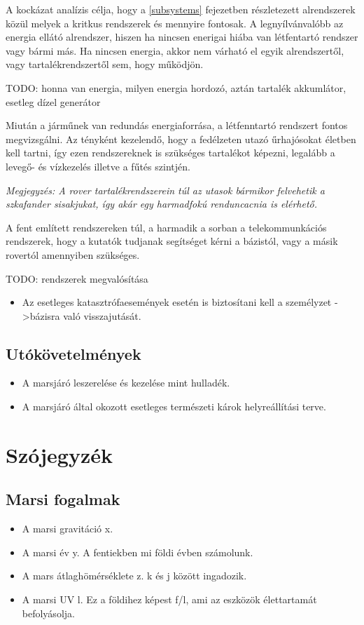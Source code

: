 \documentclass[12pt]{report}
\begin{document}
\begin{itemize}
A kockázat analízis célja, hogy a \ref{subsystems} fejezetben részletezett alrendszerek közül melyek a kritkus rendszerek és mennyire fontosak. A legnyílvánvalóbb az energia ellátó alrendszer, hiszen ha nincsen enerigai hiába van létfentartó rendszer vagy bármi más. Ha nincsen energia, akkor nem várható el egyik alrendszertől, vagy tartalékrendszertől sem, hogy működjön.

TODO: honna van energia, milyen energia hordozó, aztán tartalék akkumlátor, esetleg dízel generátor

Miután a járműnek van redundás energiaforrása, a létfenntartó rendszert fontos megvizsgálni. Az tényként kezelendő, hogy a fedélzeten utazó űrhajósokat életben kell tartni, így ezen rendszereknek is szükséges tartalékot képezni, legalább a levegő- és vízkezelés illetve a fűtés szintjén. 

\textit{Megjegyzés: A rover tartalékrendszerein túl az utasok bármikor felvehetik a szkafander sisakjukat, így akár egy harmadfokú renduncacnia is elérhető.}

A fent említett rendszereken túl, a harmadik a sorban a telekommunkációs rendszerek, hogy a kutatók tudjanak segítséget kérni a bázistól, vagy a másik rovertól amennyiben szükséges.

TODO: rendszerek megvalósítása







\begin{itemize}
  \item Az esetleges katasztrófaesemények esetén is biztosítani kell a személyzet ->bázisra való visszajutását.
\end{itemize}
\section{Utókövetelmények}
\begin{itemize}
  \item A marsjáró leszerelése és kezelése mint hulladék.
  \item A marsjáró által okozott esetleges természeti károk helyreállítási terve.
\end{itemize}

\chapter{Szójegyzék}
\section{Marsi fogalmak}
\begin{itemize}
  \item A marsi gravitáció x.
  \item A marsi év y. A fentiekben mi földi évben számolunk.
  \item A mars átlaghömérséklete z. k és j között ingadozik.
  \item A marsi UV l. Ez a földihez képest f/l, ami az eszközök élettartamát befolyásolja.
\end{itemize}


\end{itemize}
\end{document}
